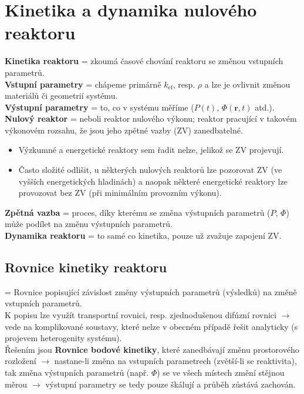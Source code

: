 \section{Kinetika a dynamika nulového reaktoru}

\textbf{Kinetika reaktoru} = zkoumá časové chování reaktoru se změnou vstupních parametrů.\\

\textbf{Vstupní parametry} = chápeme primárně $k_{\text{ef}}$, resp. $\rho$ a lze je ovlivnit změnou materiálů či geometrií systému.\\

\textbf{Výstupní parametry} = to, co v systému měříme ($P(t)$, $\Phi (\textbf{r}, t) $ atd.).\\

\textbf{Nulový reaktor} = neboli reaktor nulového výkonu; reaktor pracující v takovém výkonovém rozsahu, že jsou jeho zpětné vazby (ZV) zanedbatelné.

\begin{itemize}
  \item Výzkumné a energetické reaktory sem řadit nelze, jelikož se ZV projevují.
  \item Často složité odlišit, u některých nulových reaktorů lze pozorovat ZV (ve vyšších energetických hladinách) a naopak některé energetické reaktory lze provozovat bez ZV (při minimálním provozním výkonu).
\end{itemize}

\textbf{Zpětná vazba} = proces, díky kterému se změna výstupních parametrů ($P$, $\Phi$) může podílet na změnu výstupních parametrů.\\

\textbf{Dynamika reaktoru} = to samé co kinetika, pouze už zvažuje zapojení ZV.

\subsection{Rovnice kinetiky reaktoru}

= Rovnice popisující závislost změny výstupních parametrů (výsledků) na změně vstupních parametrů.\\

K popisu lze využít transportní rovnici, resp. zjednodušenou difúzní rovnici $\rightarrow$ vede na komplikované soustavy, které nelze v obecném případě řešit analyticky (s projevem heterogenity systému).\\

Řešením jsou \textbf{Rovnice bodové kinetiky}, které zanedbávají změnu prostorového rozložení $\rightarrow$ nastane-li změna na vstupních parametrech (zvětší-li se reaktivita), tak změna výstupních parametrů (např. $\Phi$) se ve všech místech změní stějnou měrou $\rightarrow$ výstupní parametry se tedy pouze škálují a průběh zůstává zachován.\\

